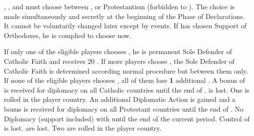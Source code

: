 
\phevnt
\aparag \FRA, \SPA, \ENG and \POL must choose between \CATHCR, \CATHCO or
Protestantism (forbidden to \SPA). The choice is made simultaneously and
secretly at the beginning of the Phase of Declarations. It cannot be
voluntarily changed later except by events. If \POL has chosen Support of
Orthodoxes, he is complied to choose \CATHCO now.

\aparag[\CATHCR]
\bparag If only one of the eligible players chooses \CATHCR, he is permanent
Sole Defender of Catholic Faith and receives 20 \VP.
\bparag If more players choose \CATHCR, the Sole Defender of Catholic Faith is
determined according normal procedure but between them only.
\bparag If none of the eligible players chooses \CATHCR, all of them lose {\bf
  1} additional \STAB.
\bparag A bonus of  is received for diplomacy on all Catholic
countries until the end of .
\aparag[\CATHCO]
 \STAB is lost.
\bparag One \REVOLT is rolled in the player country.
\bparag An additional Diplomatic Action is gained and a  bonus is
received for diplomacy on all Protestant countries until the end of
.
\aparag[Protestantism]
\bparag No Diplomacy (support included) with \payspapaute until the end of the
current period. Control of \payspapaute is lost.
 \STAB are lost.
\bparag Two \REVOLT are rolled in the player country.

